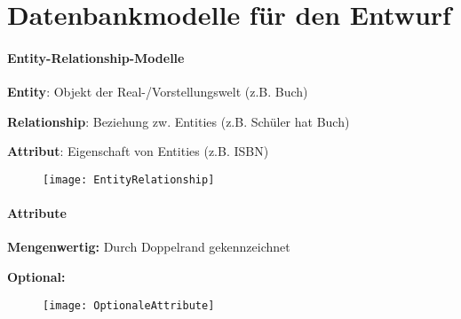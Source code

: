 \section{Datenbankmodelle für den Entwurf}
\label{sec:entwurf}

\paragraph{Entity-Relationship-Modelle}
\begin{items}
	\item \textbf{Entity}: Objekt der Real-/Vorstellungswelt (z.B. Buch)
	\item \textbf{Relationship}: Beziehung zw. Entities (z.B. Schüler hat Buch)
	\item \textbf{Attribut}: Eigenschaft von Entities (z.B. ISBN)
\end{items}
\begin{figure}[H]\centering\label{EntityRelationship}\texttt{[image: EntityRelationship]}\end{figure}

\paragraph{Attribute}
\begin{items}
	\item \textbf{Mengenwertig:} Durch Doppelrand gekennzeichnet
	\item \textbf{Optional:}
	\begin{figure}[H]\centering\label{OptionaleAttribute}\texttt{[image: OptionaleAttribute]}\end{figure}
\end{items}

